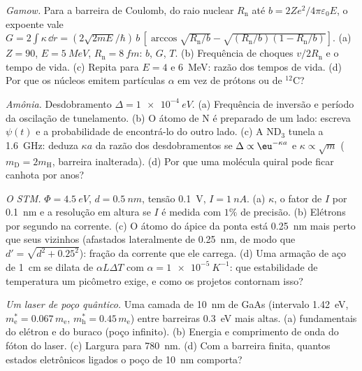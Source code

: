 \begin{exercise}[$\star\star$]\label{exo:b2:potential-wells-tunneling:9}
\emph{Gamow.} Para a barreira de Coulomb, do raio nuclear $R_{\text{n}}$
até $b = 2Ze^2/4\pi\varepsilon_0E$, o expoente vale $G = 2\int\kappa\,\dd r =
(2\sqrt{2mE}/\hbar)\,b\,[\arccos\sqrt{R_{\text{n}}/b} - \sqrt{(R_{\text{n}}/b)(1 -
R_{\text{n}}/b)}]$. (a) $Z = 90$, $E = \qty{5}{MeV}$, $R_{\text{n}} = \qty{8}{fm}$:
$b$, $G$, $T$. (b) Frequência de choques $v/2R_{\text{n}}$ e o tempo de vida. (c)
Repita para $E = 4$ e \qty{6}{MeV}: razão dos tempos de vida. (d) Por que os
núcleos emitem partículas $\alpha$ em vez de prótons ou de $^{12}$C?
\end{exercise}

\begin{exercise}[$\star\star\star$]\label{exo:b2:potential-wells-tunneling:10}
\emph{Amônia.} Desdobramento $\Delta = \qty{1e-4}{eV}$. (a) Frequência de inversão
e período da oscilação de tunelamento. (b) O átomo de N é
preparado de um lado: escreva $\psi(t)$ e a probabilidade de encontrá-lo
do outro lado. (c) A ND$_3$ tunela a \qty{1.6}{GHz}: deduza $\kappa a$
da razão dos desdobramentos se $\Delta \propto \eu^{-\kappa a}$ e $\kappa
\propto\sqrt m$ ($m_{\text{D}} = 2m_{\text{H}}$, barreira inalterada). (d) Por que
uma molécula quiral pode ficar canhota por anos?
\end{exercise}

\begin{exercise}[$\star\star\star$]\label{exo:b2:potential-wells-tunneling:11}
\emph{O STM.} $\Phi = \qty{4.5}{eV}$, $d = \qty{0.5}{nm}$, tensão \qty{0.1}{V},
$I = \qty{1}{nA}$. (a) $\kappa$, o fator de $I$ por \qty{0.1}{nm} e a
resolução em altura se $I$ é medida com $1\%$ de precisão. (b) Elétrons por segundo
na corrente. (c) O átomo do ápice da ponta está \qty{0.25}{nm} mais perto que seus
vizinhos (afastados lateralmente de \qty{0.25}{nm}, de modo que $d' = \sqrt{d^2 + 0.25^2}$):
fração da corrente que ele carrega. (d) Uma armação de aço de \qty{1}{cm} se dilata
de $\alpha L\Delta T$ com $\alpha = \qty{1e-5}{K^{-1}}$: que estabilidade de
temperatura um picômetro exige, e como os projetos contornam isso?
\end{exercise}

\begin{exercise}[$\star\star\star$]\label{exo:b2:potential-wells-tunneling:12}
\emph{Um laser de poço quântico.} Uma camada de \qty{10}{nm} de GaAs (intervalo
\qty{1.42}{eV}, $m_{\text{e}}^* = 0.067\,m_{\text{e}}$, $m_{\text{h}}^* = 0.45\,m_{\text{e}}$)
entre barreiras \qty{0.3}{eV} mais altas. (a)  fundamentais
do elétron e do buraco (poço infinito). (b) Energia e comprimento de onda do
fóton do laser. (c) Largura para \qty{780}{nm}. (d) Com a barreira finita,
quantos estados eletrônicos ligados o poço de \qty{10}{nm} comporta?
\end{exercise}

